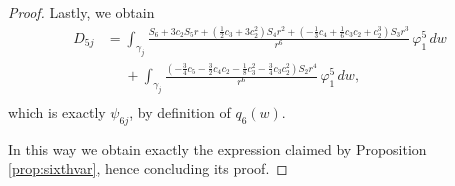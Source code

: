 \begin{proof}
Lastly, we obtain
\begin{align*}
 D_{5j} &= \int_{\gamma_j}\frac{S_6+3c_2S_5r+\left(\frac{1}{2}c_3+3c_2^2\right)S_4r^2+\left(-\frac{1}{3}c_4+\frac{1}{6}c_3c_2+c_2^3\right)S_3r^3}{r^6}\,\varphi_1^5\,dw \\
&\phantom{=} +\int_{\gamma_j}\frac{\left(-\frac{3}{4}c_5-\frac{3}{2}c_4c_2-\frac{1}{8}c_3^2-\frac{3}{4}c_3c_2^2\right)S_2r^4}{r^6}\,\varphi_1^5\,dw,  \\
\end{align*}
which is exactly $\psi_{6j}$, by definition of $q_6(w)$.

In this way we obtain exactly the expression claimed by Proposition \ref{prop:sixthvar}, hence concluding its proof. 
\end{proof}
























